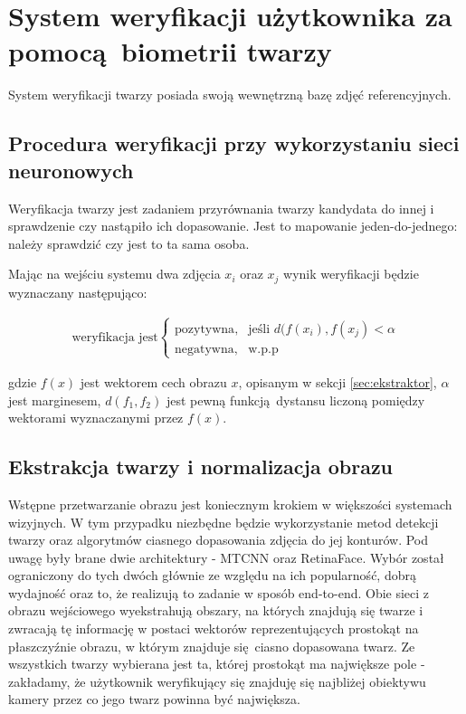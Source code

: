 

\section[verification]{System weryfikacji użytkownika za pomocą biometrii twarzy}\label{sec:verification}

System weryfikacji twarzy posiada swoją wewnętrzną bazę
zdjęć referencyjnych.

\subsection{Procedura weryfikacji przy wykorzystaniu sieci neuronowych} 

Weryfikacja twarzy jest zadaniem przyrównania twarzy kandydata 
do innej i sprawdzenie czy nastąpiło ich dopasowanie. Jest to mapowanie
jeden-do-jednego: należy sprawdzić czy jest to ta sama osoba.

Mając na wejściu systemu dwa zdjęcia \(x_i\) oraz \(x_j\) wynik weryfikacji będzie wyznaczany następująco:

\begin{align}\label{eq:ekstraktor_weryfikacja}
\text{weryfikacja jest}\begin{cases}
    \text{pozytywna},& \text{jeśli } d(f(x_i), f(x_j) < \alpha \\
    \text{negatywna},              & \text{w.p.p}
\end{cases}
\end{align}

gdzie \(f(x)\) jest wektorem cech obrazu \(x\), opisanym w sekcji
\ref{sec:ekstraktor}, \(\alpha\) jest marginesem, \(d(f_1, f_2)\) jest pewną funkcją dystansu liczoną pomiędzy wektorami wyznaczanymi przez \(f(x)\).

\subsection{Ekstrakcja twarzy i normalizacja obrazu}
Wstępne przetwarzanie obrazu jest koniecznym krokiem w większości systemach wizyjnych. W tym
przypadku niezbędne będzie wykorzystanie metod detekcji twarzy oraz algorytmów ciasnego
dopasowania zdjęcia do jej konturów. Pod uwagę były brane dwie architektury - MTCNN oraz
RetinaFace. Wybór został ograniczony do tych dwóch głównie ze względu na ich popularność, dobrą wydajność
oraz to, że realizują to zadanie w sposób end-to-end. Obie sieci z obrazu wejściowego 
   wyekstrahują obszary, na których znajdują się twarze i zwracają tę informację w postaci wektorów reprezentujących prostokąt na płaszczyźnie obrazu, w którym znajduje się ciasno dopasowana twarz. Ze wszystkich twarzy wybierana jest ta, której prostokąt ma największe pole - zakładamy, że użytkownik weryfikujący się znajduję się najbliżej obiektywu kamery przez co jego twarz powinna być największa.

